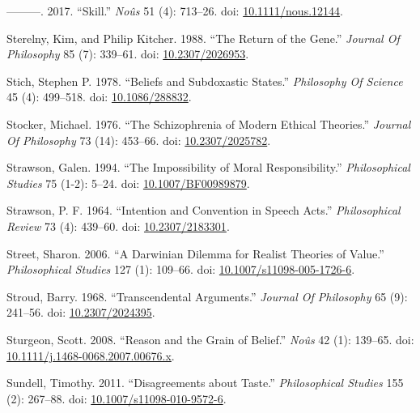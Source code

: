 \documentclass[
  10pt,
  letterpaper,
  DIV=11,
  numbers=noendperiod,
  twoside]{scrartcl}
\newlength{\cslhangindent}
\newenvironment{CSLReferences}[2] %
 {\begin{list}{}{%
  \setlength{\itemindent}{0pt}
  \setlength{\leftmargin}{0pt}
  \setlength{\parsep}{0pt}
  \ifodd #1
   \setlength{\leftmargin}{\cslhangindent}
   \setlength{\itemindent}{-1\cslhangindent}
  \fi
  \setlength{\itemsep}{#2\baselineskip}}}
 {\end{list}}
\begin{document}
\begin{CSLReferences}{1}{0}
---------. 2017. {``Skill.''} \emph{Noûs} 51 (4): 713--26. doi:
\href{https://doi.org/10.1111/nous.12144}{10.1111/nous.12144}.

Sterelny, Kim, and Philip Kitcher. 1988. {``The Return of the Gene.''}
\emph{Journal Of Philosophy} 85 (7): 339--61. doi:
\href{https://doi.org/10.2307/2026953}{10.2307/2026953}.

Stich, Stephen P. 1978. {``Beliefs and Subdoxastic States.''}
\emph{Philosophy Of Science} 45 (4): 499--518. doi:
\href{https://doi.org/10.1086/288832}{10.1086/288832}.

Stocker, Michael. 1976. {``The Schizophrenia of Modern Ethical
Theories.''} \emph{Journal Of Philosophy} 73 (14): 453--66. doi:
\href{https://doi.org/10.2307/2025782}{10.2307/2025782}.

Strawson, Galen. 1994. {``The Impossibility of Moral Responsibility.''}
\emph{Philosophical Studies} 75 (1-2): 5--24. doi:
\href{https://doi.org/10.1007/BF00989879}{10.1007/BF00989879}.

Strawson, P. F. 1964. {``Intention and Convention in Speech Acts.''}
\emph{Philosophical Review} 73 (4): 439--60. doi:
\href{https://doi.org/10.2307/2183301}{10.2307/2183301}.

Street, Sharon. 2006. {``A Darwinian Dilemma for Realist Theories of
Value.''} \emph{Philosophical Studies} 127 (1): 109--66. doi:
\href{https://doi.org/10.1007/s11098-005-1726-6}{10.1007/s11098-005-1726-6}.

Stroud, Barry. 1968. {``Transcendental Arguments.''} \emph{Journal Of
Philosophy} 65 (9): 241--56. doi:
\href{https://doi.org/10.2307/2024395}{10.2307/2024395}.

Sturgeon, Scott. 2008. {``Reason and the Grain of Belief.''} \emph{Noûs}
42 (1): 139--65. doi:
\href{https://doi.org/10.1111/j.1468-0068.2007.00676.x}{10.1111/j.1468-0068.2007.00676.x}.

Sundell, Timothy. 2011. {``Disagreements about Taste.''}
\emph{Philosophical Studies} 155 (2): 267--88. doi:
\href{https://doi.org/10.1007/s11098-010-9572-6}{10.1007/s11098-010-9572-6}.


\end{CSLReferences}
\end{document}
